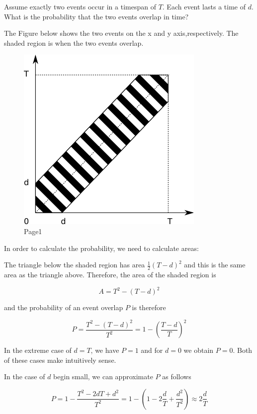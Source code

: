 

Assume exactly two events occur in a timespan of \(T\). Each event lasts a time of \(d\). What is the probability that the two events overlap in time?

The Figure below shows the two events on the x and y axis,respectively. The shaded region is when the two events overlap.

\begin{figure}[H]
\centering
\includegraphics{images/concurrent_events.png}
\caption{Page1}
\end{figure}

In order to calculate the probability, we need to calculate areas:

The triangle below the shaded region has area \(\frac{1}{2}(T-d)^2\) and this is the same area as the triangle above. Therefore, the area of the shaded region is

\[
A = T^2 - (T-d)^2
\]

and the probability of an event overlap \(P\) is therefore

\[
P = \frac{T^2 - (T-d)^2}{T^2} = 1 - \left( \frac{T-d}{T}\right)^2
\]

In the extreme case of \(d=T\), we have \(P=1\) and for \(d=0\) we obtain \(P=0\). Both of these cases make intuitively sense.

In the case of \(d\) begin small, we can approximate \(P\) as follows

\[
P = 1 -  \frac{T^2 - 2dT + d^2}{T^2} = 1 - \left( 1 - 2\frac{d}{T} + \frac{d^2}{T^2} \right) \approx 2 \frac{d}{T}
\]

